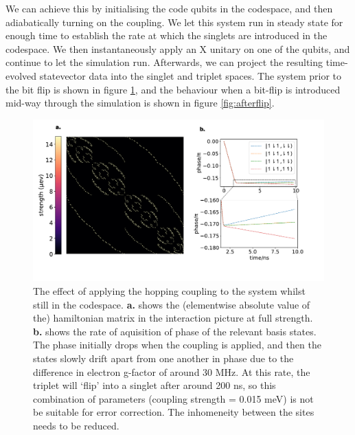 \documentclass{report}
\begin{document}
We can achieve this by initialising the code qubits in the codespace, and then adiabatically turning on the coupling. We let this system run in steady state for enough time to establish the rate at which the singlets are introduced in the codespace. We then instantaneously apply an X unitary on one of the qubits, and continue to let the simulation run. Afterwards, we can project the resulting time-evolved statevector data into the singlet and triplet spaces. The system prior to the bit flip is shown in figure \ref{fig:beforeflip}, and the behaviour when a bit-flip is introduced mid-way through the simulation is shown in figure \ref{fig:afterflip}.
\begin{figure}[ht]
    \centering
    \includegraphics[scale = 1]{Figures/singlettriplet.pdf}
    \caption{The effect of applying the hopping coupling to the system whilst still in the codespace. \textbf{a.} shows the (elementwise absolute value of the) hamiltonian matrix in the interaction picture at full strength. \textbf{b.} shows the rate of aquisition of phase of the relevant basis states. The phase initially drops when the coupling is applied, and then the states slowly drift apart from one another in phase due to the difference in electron g-factor of around 30 \unit{\mega\hertz}. At this rate, the triplet will `flip' into a singlet after around 200 \unit{\nano \second}, so this combination of parameters (coupling strength = 0.015 \unit{\milli\electronvolt}) is not be suitable for error correction. The inhomeneity between the sites needs to be reduced.
    }\label{fig:beforeflip}
\end{figure}
\end{document}
